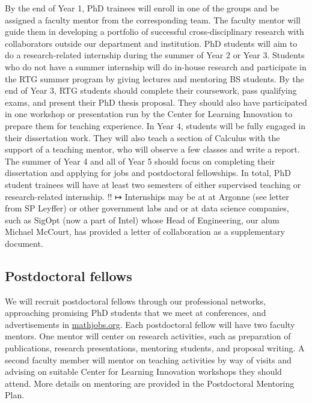\documentclass[11pt]{NSFamsart}
\begin{document}
{%
By the end of Year 1, PhD trainees will enroll in one of the groups and be assigned a faculty mentor from the corresponding team. 
The faculty mentor will guide them in developing a portfolio of successful cross-disciplinary research with collaborators outside our department and institution.  %
PhD students will aim to do a research-related internship during the summer of Year 2 or Year 3. Students who do not have
a summer internship will do in-house research and participate in the RTG summer program by giving lectures and mentoring BS students. 
By the end of Year 3, RTG students should complete their coursework, pass qualifying exams, and present their PhD thesis proposal. They should also have participated in one   workshop or presentation run by the Center for Learning Innovation to prepare them for teaching experience. 
In Year 4, students will be fully engaged in their dissertation work. They will also teach a section of Calculus with the support of a teaching mentor, who will observe a few classes and write a report. 
The summer of Year 4 and all of Year 5 should focus on completing their dissertation and applying for jobs and postdoctoral fellowships.
In total, PhD student trainees will have at least two semesters of either supervised teaching or research-related internship. 
{\color{red} !! ↦\mapsto } Internships may be at at Argonne (see letter from SP Leyffer) or other government labs and or at data science companies, such as SigOpt (now a part of Intel) whose Head of Engineering, our alum Michael McCourt, has provided a letter  of collaboration as a supplementary document. 


\subsection*{Postdoctoral fellows}
We will recruit postdoctoral fellows through our professional networks, approaching promising PhD students that we meet at conferences, and advertisements in \url{mathjobs.org}. Each postdoctoral fellow will have two faculty mentors. One mentor will center on research activities, such as preparation of 
publications, research presentations, mentoring students, and proposal writing. A second faculty member will mentor on teaching activities by way of visits and advising on suitable Center for Learning Innovation workshops they should attend. More details on mentoring are provided in the Postdoctoral Mentoring Plan.

}
\end{document}
